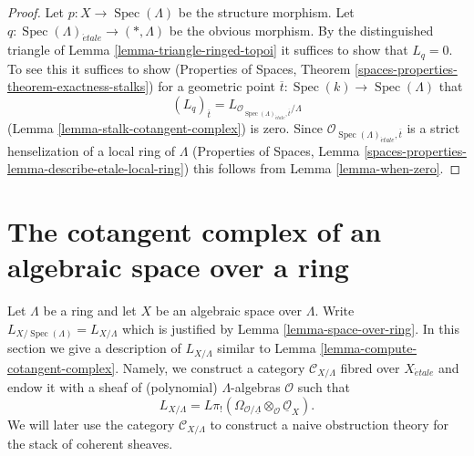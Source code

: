 \documentclass{stacks-project}
\theoremstyle{plain}
\theoremstyle{definition}
\theoremstyle{remark}
\numberwithin{equation}{subsection}
\def\Spec{\mathop{\mathrm{Spec}}}
\def\etale{{\acute{e}tale}}
\begin{document}
\begin{proof}
Let $p : X \to \Spec(\Lambda)$ be the structure morphism.
Let $q : \Spec(\Lambda)_\etale \to (*, \Lambda)$
be the obvious morphism. By the distinguished triangle of
Lemma \ref{lemma-triangle-ringed-topoi}
it suffices to show that $L_q = 0$. To see this it suffices to
show
(Properties of Spaces, Theorem
\ref{spaces-properties-theorem-exactness-stalks})
for a geometric point $\overline{t} : \Spec(k) \to \Spec(\Lambda)$ that
$$
(L_q)_{\overline{t}} =
L_{\mathcal{O}_{\Spec(\Lambda)_\etale, \overline{t}}/\Lambda}
$$
(Lemma \ref{lemma-stalk-cotangent-complex})
is zero. Since $\mathcal{O}_{\Spec(\Lambda)_\etale, \overline{t}}$
is a strict henselization of a local ring of $\Lambda$
(Properties of Spaces, Lemma
\ref{spaces-properties-lemma-describe-etale-local-ring})
this follows from Lemma \ref{lemma-when-zero}.
\end{proof}










\section{The cotangent complex of an algebraic space over a ring}
\label{section-cotangent-spaces-variant}

\noindent
Let $\Lambda$ be a ring and let $X$ be an algebraic space over $\Lambda$.
Write $L_{X/\Spec(\Lambda)} = L_{X/\Lambda}$ which is justified
by Lemma \ref{lemma-space-over-ring}.
In this section we give a description of $L_{X/\Lambda}$ similar to
Lemma \ref{lemma-compute-cotangent-complex}.
Namely, we construct a category $\mathcal{C}_{X/\Lambda}$
fibred over $X_\etale$ and endow it with a sheaf of (polynomial)
$\Lambda$-algebras $\mathcal{O}$ such that
$$
L_{X/\Lambda} =
L\pi_!(\Omega_{\mathcal{O}/\underline{\Lambda}} \otimes_\mathcal{O}
\underline{\mathcal{O}}_X).
$$
We will later use the category $\mathcal{C}_{X/\Lambda}$ to construct
a naive obstruction theory for the stack of coherent sheaves.
\end{document}
